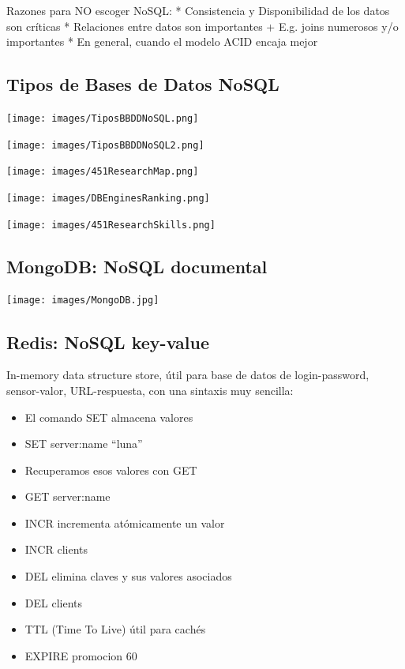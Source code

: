 \documentclass[]{book}
\providecommand{\tightlist}{%
  \setlength{\itemsep}{0pt}\setlength{\parskip}{0pt}}
\begin{document}
Razones para NO escoger NoSQL:
* Consistencia y Disponibilidad de los datos son críticas
* Relaciones entre datos son importantes
+ E.g. joins numerosos y/o importantes
* En general, cuando el modelo ACID encaja mejor

\hypertarget{tipos-de-bases-de-datos-nosql}{%
\subsection{Tipos de Bases de Datos NoSQL}\label{tipos-de-bases-de-datos-nosql}}

\texttt{[image: images/TiposBBDDNoSQL.png]}

\texttt{[image: images/TiposBBDDNoSQL2.png]}

\texttt{[image: images/451ResearchMap.png]}

\texttt{[image: images/DBEnginesRanking.png]}

\texttt{[image: images/451ResearchSkills.png]}

\hypertarget{mongodb-nosql-documental}{%
\subsection{MongoDB: NoSQL documental}\label{mongodb-nosql-documental}}

\texttt{[image: images/MongoDB.jpg]}

\hypertarget{redis-nosql-key-value}{%
\subsection{Redis: NoSQL key-value}\label{redis-nosql-key-value}}

In-memory data structure store, útil para base de datos de login-password, sensor-valor, URL-respuesta, con una sintaxis muy sencilla:

\begin{itemize}
\tightlist
\item
  El comando SET almacena valores
\item
  SET server:name ``luna''
\item
  Recuperamos esos valores con GET
\item
  GET server:name
\item
  INCR incrementa atómicamente un valor
\item
  INCR clients
\item
  DEL elimina claves y sus valores asociados
\item
  DEL clients
\item
  TTL (Time To Live) útil para cachés
\item
  EXPIRE promocion 60
\end{itemize}
\end{document}
